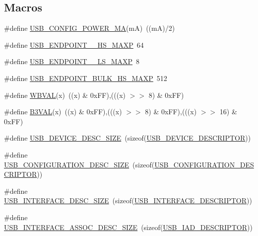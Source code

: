 \subsection*{Macros}
\begin{DoxyCompactItemize}
\item 
\#define \hyperlink{group__USBD__Core_gadcf08dc7fdb6117608624203612b3104}{U\-S\-B\-\_\-\-C\-O\-N\-F\-I\-G\-\_\-\-P\-O\-W\-E\-R\-\_\-\-M\-A}(m\-A)~((m\-A)/2)
\item 
\#define \hyperlink{group__USBD__Core_gac8df859211824ddcf32db5c80b06290a}{U\-S\-B\-\_\-\-E\-N\-D\-P\-O\-I\-N\-T\-\_\-\_\-\-H\-S\-\_\-\-M\-A\-X\-P}~64
\item 
\#define \hyperlink{group__USBD__Core_ga2b0c6c2be1d518967da6c7b32458c894}{U\-S\-B\-\_\-\-E\-N\-D\-P\-O\-I\-N\-T\-\_\-\_\-\-L\-S\-\_\-\-M\-A\-X\-P}~8
\item 
\#define \hyperlink{group__USBD__Core_gad4839d37e7a31a4d9e8ddf242b16608f}{U\-S\-B\-\_\-\-E\-N\-D\-P\-O\-I\-N\-T\-\_\-\-B\-U\-L\-K\-\_\-\-H\-S\-\_\-\-M\-A\-X\-P}~512
\item 
\#define \hyperlink{group__USBD__Core_ga018fc058eba40cffd92be1756a5d2b40}{W\-B\-V\-A\-L}(x)~((x) \& 0x\-F\-F),(((x) $>$$>$ 8) \& 0x\-F\-F)
\item 
\#define \hyperlink{group__USBD__Core_ga217165f37f8e1835ea51da6e19768402}{B3\-V\-A\-L}(x)~((x) \& 0x\-F\-F),(((x) $>$$>$ 8) \& 0x\-F\-F),(((x) $>$$>$ 16) \& 0x\-F\-F)
\item 
\#define \hyperlink{group__USBD__Core_gacd04660262562260957b6df8d5e482b3}{U\-S\-B\-\_\-\-D\-E\-V\-I\-C\-E\-\_\-\-D\-E\-S\-C\-\_\-\-S\-I\-Z\-E}~(sizeof(\hyperlink{group__USBD__Core_ga7c2da119cc5c129d253d5fa766c70893}{U\-S\-B\-\_\-\-D\-E\-V\-I\-C\-E\-\_\-\-D\-E\-S\-C\-R\-I\-P\-T\-O\-R}))
\item 
\#define \hyperlink{group__USBD__Core_ga136546c0b0fefbc4d0684f1a70a86d3e}{U\-S\-B\-\_\-\-C\-O\-N\-F\-I\-G\-U\-R\-A\-T\-I\-O\-N\-\_\-\-D\-E\-S\-C\-\_\-\-S\-I\-Z\-E}~(sizeof(\hyperlink{group__USBD__Core_ga196f799666c475a9064909c6e72b9d72}{U\-S\-B\-\_\-\-C\-O\-N\-F\-I\-G\-U\-R\-A\-T\-I\-O\-N\-\_\-\-D\-E\-S\-C\-R\-I\-P\-T\-O\-R}))
\item 
\#define \hyperlink{group__USBD__Core_gac7fd274cdd131f4c0addec7a139bc9b7}{U\-S\-B\-\_\-\-I\-N\-T\-E\-R\-F\-A\-C\-E\-\_\-\-D\-E\-S\-C\-\_\-\-S\-I\-Z\-E}~(sizeof(\hyperlink{group__USBD__Core_gac933513ce6cbf852d0dc998bd8fb333d}{U\-S\-B\-\_\-\-I\-N\-T\-E\-R\-F\-A\-C\-E\-\_\-\-D\-E\-S\-C\-R\-I\-P\-T\-O\-R}))
\item 
\#define \hyperlink{group__USBD__Core_gae377b4fc3e66e90afb99e60fa5cc0a94}{U\-S\-B\-\_\-\-I\-N\-T\-E\-R\-F\-A\-C\-E\-\_\-\-A\-S\-S\-O\-C\-\_\-\-D\-E\-S\-C\-\_\-\-S\-I\-Z\-E}~(sizeof(\hyperlink{group__USBD__Core_ga6b053e842151d5c5dcdace597e45a36b}{U\-S\-B\-\_\-\-I\-A\-D\-\_\-\-D\-E\-S\-C\-R\-I\-P\-T\-O\-R}))
$$
\end{DoxyCompactItemize}
